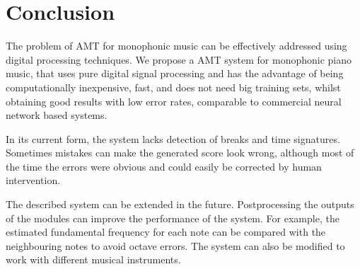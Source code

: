 \documentclass[conference]{IEEEtran}
\begin{document}
\section{Conclusion}
The problem of AMT for monophonic music can be effectively addressed using digital processing techniques.
We propose a AMT system for monophonic piano music, that uses pure digital signal processing and has the advantage of being computationally inexpensive, fast, and does not need big training sets, whilst obtaining good results with low error rates, comparable to commercial neural network based systems.

In its current form, the system lacks detection of breaks and time signatures.
Sometimes mistakes can make the generated score look wrong, although most of the time the errors were obvious and could easily be corrected by human intervention.

The described system can be extended in the future.
Postprocessing the outputs of the modules can improve the performance of the system.
For example, the estimated fundamental frequency for each note can be compared with the neighbouring notes to avoid octave errors.
The system can also be modified to work with different musical instruments.




\nocite{MllerAUDIO}
\nocite{Gao2015PITCHDB}
\end{document}
